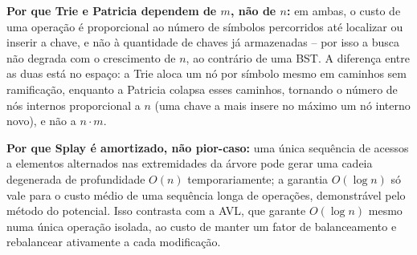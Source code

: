 \documentclass[conference]{IEEEtran}
\begin{document}
\begin{table}[htbp]
\centering
\caption{Complexidade assintótica das operações fundamentais}
\label{tab:complexidade}
\end{table}

\textbf{Por que Trie e Patricia dependem de $m$, não de $n$:} em ambas, o custo de uma operação é proporcional ao número de símbolos percorridos até localizar ou inserir a chave, e não à quantidade de chaves já armazenadas -- por isso a busca não degrada com o crescimento de $n$, ao contrário de uma BST. A diferença entre as duas está no espaço: a Trie aloca um nó por símbolo mesmo em caminhos sem ramificação, enquanto a Patricia colapsa esses caminhos, tornando o número de nós internos proporcional a $n$ (uma chave a mais insere no máximo um nó interno novo), e não a $n \cdot m$.

\textbf{Por que Splay é amortizado, não pior-caso:} uma única sequência de acessos a elementos alternados nas extremidades da árvore pode gerar uma cadeia degenerada de profundidade $O(n)$ temporariamente; a garantia $O(\log n)$ só vale para o custo médio de uma sequência longa de operações, demonstrável pelo método do potencial. Isso contrasta com a AVL, que garante $O(\log n)$ mesmo numa única operação isolada, ao custo de manter um fator de balanceamento e rebalancear ativamente a cada modificação.
\end{document}
